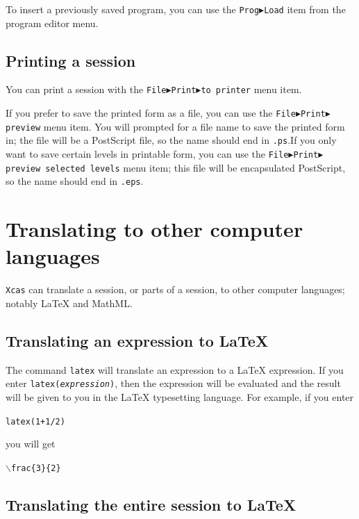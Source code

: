 \documentclass[a4paper,11pt]{book}
\begin{document}
To insert a previously saved program, you can use the
\texttt{Prog$\blacktriangleright$Load} item from the program editor menu.

\subsection{Printing a session}

You can print a session with the
\texttt{File$\blacktriangleright$Print$\blacktriangleright$to printer}
menu item.  

If you prefer to save the printed form as a file, you can use the 
\texttt{File$\blacktriangleright$Print$\blacktriangleright$preview}
menu item.  You will prompted for a file name to save the printed form
in; the file will be a PostScript file, so the name should end in
\texttt{.ps}.If you only want to save certain levels in printable
form, you can use the 
\texttt{File$\blacktriangleright$Print$\blacktriangleright$preview
selected levels} menu item; this file will be encapsulated PostScript,
so the name should end in \texttt{.eps}.

\section{Translating to other computer languages}

\texttt{Xcas} can translate a session, or parts of a session, to other
computer languages; notably \LaTeX{} and MathML.

\subsection{Translating an expression to \LaTeX{}}

The command \texttt{latex} will translate an expression to a \LaTeX{}
expression.  If you enter \texttt{latex(\textit{expression})}, then
the expression will be evaluated and the result will be given to you
in the \LaTeX{} typesetting language.  For example, if you enter
\begin{center}
  {\tt latex(1+1/2)}
\end{center}
you will get
\begin{center}
  {\tt $\backslash $frac\{3\}\{2\}}
\end{center}

\subsection{Translating the entire session to \LaTeX{}}
\end{document}
